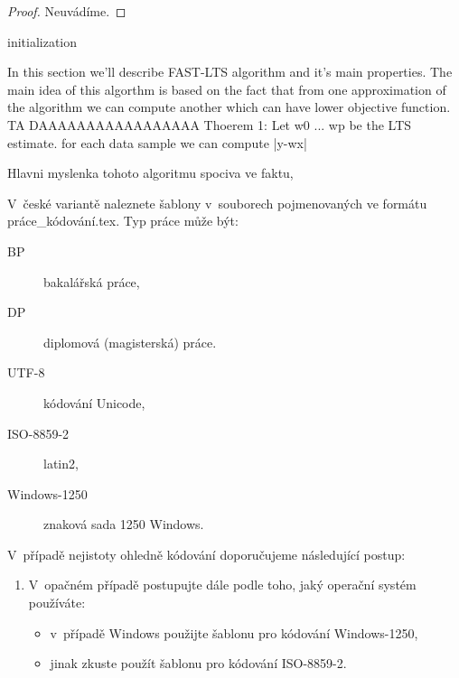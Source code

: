 \begin{proof}
	Neuvádíme.
\end{proof}
   





\begin{algorithm}[H]
	initialization\;
\end{algorithm}



	
   
In this section we'll describe FAST-LTS algorithm and it's main properties. The main idea of this algorthm is based on the fact that from one approximation of the algorithm we can compute another which can have lower objective function.
 TA DAAAAAAAAAAAAAAAAA
Thoerem 1: \cite{rybicka}
Let w0 ... wp be the LTS estimate.
for each data sample we can compute |y-wx|



Hlavni myslenka tohoto algoritmu spociva ve faktu, 



V~české variantě naleznete šablony v~souborech pojmenovaných ve formátu práce\_kódování.tex. Typ práce může být:
\begin{description}
	\item[BP] bakalářská práce,
	\item[DP] diplomová (magisterská) práce.
\end{description}
\begin{description}
	\item[UTF-8] kódování Unicode,
	\item[ISO-8859-2] latin2,
	\item[Windows-1250] znaková sada 1250 Windows.
\end{description}
V~případě nejistoty ohledně kódování doporučujeme následující postup:
\begin{enumerate}
	\item V~opačném případě postupujte dále podle toho, jaký operační systém používáte:
	\begin{itemize}
		\item v~případě Windows použijte šablonu pro kódování \mbox{Windows-1250},
		\item jinak zkuste použít šablonu pro kódování \mbox{ISO-8859-2}.
	\end{itemize}
\end{enumerate}


